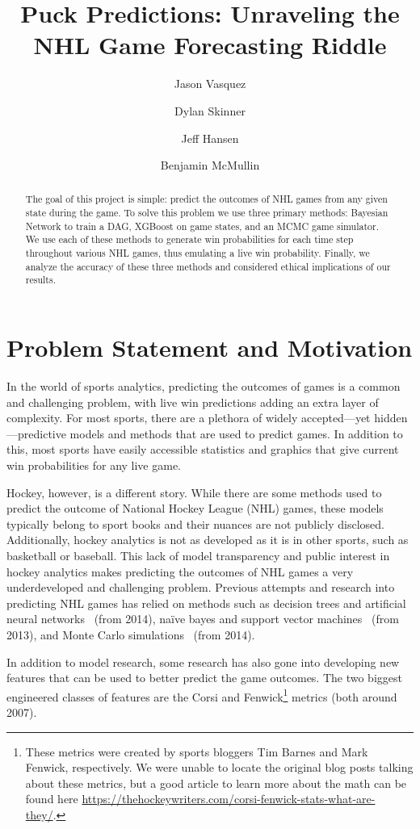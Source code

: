 \documentclass[11pt]{article}
\title{Puck Predictions: Unraveling the NHL Game Forecasting Riddle}
\author{Jason Vasquez \and Dylan Skinner \and Jeff Hansen \and Benjamin McMullin}
\begin{document}
\maketitle

\begin{abstract}
    The goal of this project is simple: predict the outcomes of NHL games from any given state during the game. To solve this problem we use three primary methods: Bayesian Network to train a DAG, XGBoost on game states, and an MCMC game simulator. We use each of these methods to generate win probabilities for each time step throughout various NHL games, thus emulating a live win probability. Finally, we analyze the accuracy of these three methods and considered ethical implications of our results.
\end{abstract}

\section{Problem Statement and Motivation}
In the world of sports analytics, predicting the outcomes of games is a common and challenging problem, with live win predictions adding
an extra layer of complexity. For most sports, there are a plethora of widely accepted—yet hidden—predictive models and methods that are used to
predict games. In addition to this, most sports have easily accessible statistics and graphics that give current win probabilities for any live game.

Hockey, however, is a different story. While there are some methods used to predict the outcome of National Hockey League (NHL) games, these models
typically belong to sport books and their nuances are not publicly disclosed. Additionally, hockey analytics is not as
developed as it is in other sports, such as basketball or baseball. This lack of model transparency and public interest in hockey analytics
makes predicting the outcomes of NHL games a very underdeveloped and challenging problem. Previous attempts and research into predicting NHL games
has relied on methods such as decision trees and artificial neural networks~\cite{pishcedda} (from 2014), naïve bayes and support vector machines~\cite{weissbock2013use} (from 2013),
and Monte Carlo simulations~\cite{Weissbock2014ForecastingSI} (from 2014).

In addition to model research, some research has also gone into developing new features that can be used to better predict the game outcomes. 
The two biggest engineered classes of features are the Corsi
 and Fenwick\footnote{These metrics were created by sports bloggers Tim Barnes and Mark Fenwick, respectively. 
 We were unable to locate the original blog posts talking about these metrics, but a good article to learn more about the math can be
 found here \url{https://thehockeywriters.com/corsi-fenwick-stats-what-are-they/}.} metrics (both around 2007). 
\end{document}
